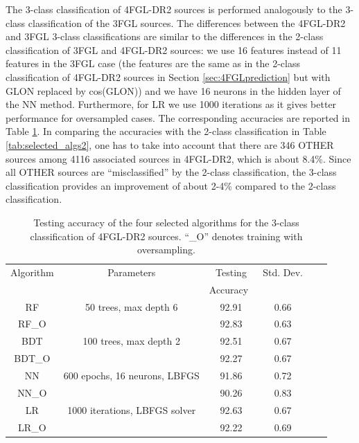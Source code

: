 The 3-class classification of 4FGL-DR2 sources is performed analogously to the 3-class classification of the 3FGL sources.
The differences between the 4FGL-DR2 and 3FGL 3-class classifications are similar to the differences in the 2-class classification of 3FGL and 4FGL-DR2 sources:
we use 16 features instead of 11 features in the 3FGL case (the features are the same as in the 2-class classification of 4FGL-DR2 sources in Section \ref{sec:4FGLprediction} but with GLON replaced by cos(GLON))
and we have 16 neurons in the hidden layer of the NN method. Furthermore, for LR we use 1000 iterations as it gives better performance for oversampled cases.
The corresponding accuracies are reported in Table \ref{tab:selected_algs_4fgl_multi}.
In comparing the accuracies with the 2-class classification in Table \ref{tab:selected_algs2}, 
one has to take into account that there are 346 OTHER sources among 4116 associated sources in 4FGL-DR2, which is about 8.4\%.
Since all OTHER sources are ``misclassified'' by the 2-class classification, the 3-class classification provides an improvement of about 2-4\% compared to the 2-class classification.

\begin{table}[!h]
\hspace{-0.2cm}
    \tiny
  \centering
    \renewcommand{\tabcolsep}{0.4mm}
\renewcommand{\arraystretch}{1.6}
    \begin{tabular}{c c c c c c}
    \hline
    \hline
    Algorithm&Parameters &  Testing&Std. Dev.\\
    & & Accuracy\ &  \\
    \hline
    RF & 50 trees, max depth 6  &92.91&0.66\\
    RF\_O &   &92.83&0.63 \\
    \hline
    BDT & 100 trees, max depth 2    &   92.51&0.67 \\
    BDT\_O &     &   92.27&0.67 \\
    \hline
    NN & 600 epochs, 16 neurons, LBFGS & 91.86&0.72\\
    NN\_O &  & 90.26&0.83\\
    \hline
    LR & 1000 iterations, LBFGS solver & 92.63&0.67 \\
    LR\_O &  &92.22&0.69\\
    \hline
     
    \end{tabular}%
    \vspace{2mm}
    \caption{Testing accuracy of the four selected algorithms for the 3-class classification of 4FGL-DR2 sources. 
    ``\_O'' denotes training with oversampling.}
    \label{tab:selected_algs_4fgl_multi}
\end{table}


